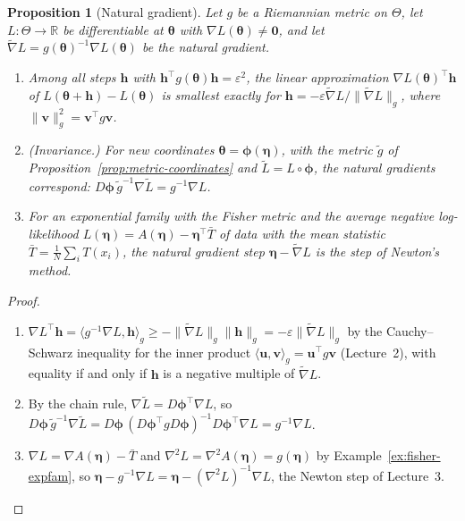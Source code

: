 \documentclass[11pt]{article}
\newcommand{\norm}[1]{\lVert #1 \rVert}
\newcommand{\ip}[2]{\langle #1, #2 \rangle}
\theoremstyle{definition}
\theoremstyle{plain}
\newtheorem{proposition}[definition]{Proposition}
\theoremstyle{remark}
\begin{document}
\begin{proposition}[Natural gradient]\label{prop:natural-gradient}
    Let $g$ be a Riemannian metric on $\Theta$, let $L: \Theta \to \mathbb{R}$ be differentiable at $\boldsymbol{\theta}$ with $\nabla L(\boldsymbol{\theta}) \neq \mathbf{0}$, and let $\tilde\nabla L = g(\boldsymbol{\theta})^{-1}\nabla L(\boldsymbol{\theta})$ be the natural gradient.
    \begin{enumerate}
        \item Among all steps $\mathbf{h}$ with $\mathbf{h}^\top g(\boldsymbol{\theta})\mathbf{h} = \varepsilon^2$, the linear approximation $\nabla L(\boldsymbol{\theta})^\top\mathbf{h}$ of $L(\boldsymbol{\theta} + \mathbf{h}) - L(\boldsymbol{\theta})$ is smallest exactly for $\mathbf{h} = -\varepsilon\tilde\nabla L/\norm{\tilde\nabla L}_g$, where $\norm{\mathbf{v}}_g^2 = \mathbf{v}^\top g\mathbf{v}$.
        \item (Invariance.) For new coordinates $\boldsymbol{\theta} = \boldsymbol{\phi}(\boldsymbol{\eta})$, with the metric $\tilde g$ of Proposition~\ref{prop:metric-coordinates} and $\tilde L = L \circ \boldsymbol{\phi}$, the natural gradients correspond: $D\boldsymbol{\phi}\,\tilde g^{-1}\nabla\tilde L = g^{-1}\nabla L$.
        \item For an exponential family with the Fisher metric and the average negative log-likelihood $L(\boldsymbol{\eta}) = A(\boldsymbol{\eta}) - \boldsymbol{\eta}^\top\bar T$ of data with the mean statistic $\bar T = \frac{1}{N}\sum_i T(x_i)$, the natural gradient step $\boldsymbol{\eta} - \tilde\nabla L$ is the step of Newton's method.
    \end{enumerate}
\end{proposition}

\begin{proof}
    \begin{enumerate}
        \item $\nabla L^\top\mathbf{h} = \ip{g^{-1}\nabla L}{\mathbf{h}}_g \geq -\norm{\tilde\nabla L}_g\norm{\mathbf{h}}_g = -\varepsilon\norm{\tilde\nabla L}_g$ by the Cauchy--Schwarz inequality for the inner product $\ip{\mathbf{u}}{\mathbf{v}}_g = \mathbf{u}^\top g\mathbf{v}$ (Lecture~2), with equality if and only if $\mathbf{h}$ is a negative multiple of $\tilde\nabla L$.
        \item By the chain rule, $\nabla\tilde L = D\boldsymbol{\phi}^\top\nabla L$, so $D\boldsymbol{\phi}\,\tilde g^{-1}\nabla\tilde L = D\boldsymbol{\phi}\,(D\boldsymbol{\phi}^\top gD\boldsymbol{\phi})^{-1}D\boldsymbol{\phi}^\top\nabla L = g^{-1}\nabla L$.
        \item $\nabla L = \nabla A(\boldsymbol{\eta}) - \bar T$ and $\nabla^2L = \nabla^2A(\boldsymbol{\eta}) = g(\boldsymbol{\eta})$ by Example~\ref{ex:fisher-expfam}, so $\boldsymbol{\eta} - g^{-1}\nabla L = \boldsymbol{\eta} - (\nabla^2L)^{-1}\nabla L$, the Newton step of Lecture~3. \qedhere
    \end{enumerate}
\end{proof}
\end{document}
